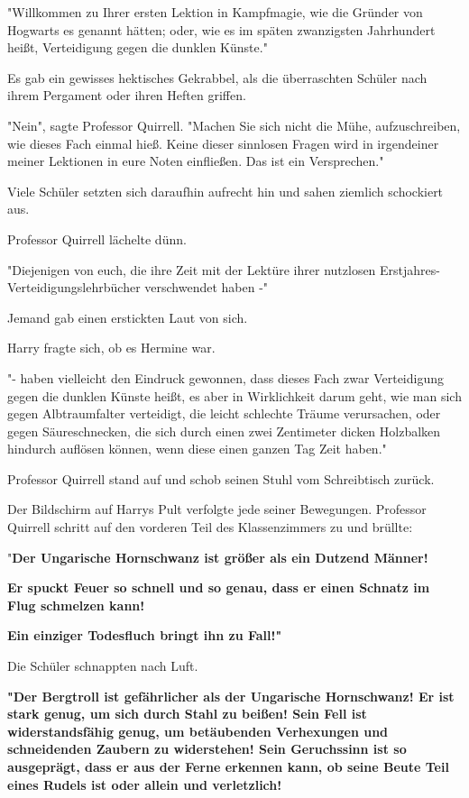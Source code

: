 {"Willkommen zu Ihrer ersten Lektion in Kampfmagie, wie die Gründer von Hogwarts es genannt hätten; oder, wie es im späten zwanzigsten Jahrhundert heißt, Verteidigung gegen die dunklen Künste."

Es gab ein gewisses hektisches Gekrabbel, als die überraschten Schüler nach ihrem Pergament oder ihren Heften griffen.

"Nein", sagte Professor Quirrell. "Machen Sie sich nicht die Mühe, aufzuschreiben, wie dieses Fach einmal hieß. Keine dieser sinnlosen Fragen wird in irgendeiner meiner Lektionen in eure Noten einfließen. Das ist ein Versprechen."

Viele Schüler setzten sich daraufhin aufrecht hin und sahen ziemlich schockiert aus.

Professor Quirrell lächelte dünn.

"Diejenigen von euch, die ihre Zeit mit der Lektüre ihrer nutzlosen Erstjahres-Verteidigungslehrbücher verschwendet haben -"

Jemand gab einen erstickten Laut von sich.

Harry fragte sich, ob es Hermine war.

"- haben vielleicht den Eindruck gewonnen, dass dieses Fach zwar Verteidigung gegen die dunklen Künste heißt, es aber in Wirklichkeit darum geht, wie man sich gegen Albtraumfalter verteidigt, die leicht schlechte Träume verursachen, oder gegen Säureschnecken, die sich durch einen zwei Zentimeter dicken Holzbalken hindurch auflösen können, wenn diese einen ganzen Tag Zeit haben."

Professor Quirrell stand auf und schob seinen Stuhl vom Schreibtisch zurück.

Der Bildschirm auf Harrys Pult verfolgte jede seiner Bewegungen. Professor Quirrell schritt auf den vorderen Teil des Klassenzimmers zu und brüllte:

"\textbf{Der Ungarische Hornschwanz ist größer als ein Dutzend Männer!}

\textbf{Er spuckt Feuer so schnell und so genau, dass er einen Schnatz im Flug schmelzen kann!}

\textbf{Ein einziger Todesfluch bringt ihn zu Fall!"}

Die Schüler schnappten nach Luft.

\textbf{"Der Bergtroll ist gefährlicher als der Ungarische Hornschwanz! Er ist stark genug, um sich durch Stahl zu beißen! Sein Fell ist widerstandsfähig genug, um betäubenden Verhexungen und schneidenden Zaubern zu widerstehen! Sein Geruchssinn ist so ausgeprägt, dass er aus der Ferne erkennen kann, ob seine Beute Teil eines Rudels ist oder allein und verletzlich!}

}
